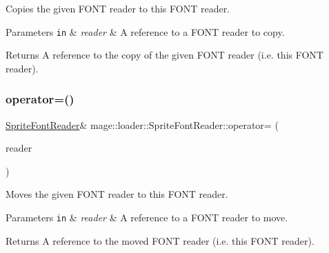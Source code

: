 Copies the given F\+O\+NT reader to this F\+O\+NT reader.


\begin{DoxyParams}[1]{Parameters}
\mbox{\tt in}  & {\em reader} & A reference to a F\+O\+NT reader to copy. \\
\hline
\end{DoxyParams}
\begin{DoxyReturn}{Returns}
A reference to the copy of the given F\+O\+NT reader (i.\+e. this F\+O\+NT reader). 
\end{DoxyReturn}
\hypertarget{classmage_1_1loader_1_1_sprite_font_reader_a99c1034c7dbe89b5e2dc2f2106c09360}{}\label{classmage_1_1loader_1_1_sprite_font_reader_a99c1034c7dbe89b5e2dc2f2106c09360} 
\subsubsection{\texorpdfstring{operator=()}{operator=()}\hspace{0.1cm}{\footnotesize\ttfamily [2/2]}}
{\footnotesize\ttfamily \hyperlink{classmage_1_1loader_1_1_sprite_font_reader}{Sprite\+Font\+Reader}\& mage\+::loader\+::\+Sprite\+Font\+Reader\+::operator= (\begin{DoxyParamCaption}\item[{\hyperlink{classmage_1_1loader_1_1_sprite_font_reader}{Sprite\+Font\+Reader} \&\&}]{reader }\end{DoxyParamCaption})\hspace{0.3cm}{\ttfamily [delete]}}

Moves the given F\+O\+NT reader to this F\+O\+NT reader.


\begin{DoxyParams}[1]{Parameters}
\mbox{\tt in}  & {\em reader} & A reference to a F\+O\+NT reader to move. \\
\hline
\end{DoxyParams}
\begin{DoxyReturn}{Returns}
A reference to the moved F\+O\+NT reader (i.\+e. this F\+O\+NT reader). 
\end{DoxyReturn}
\hypertarget{classmage_1_1loader_1_1_sprite_font_reader_a9726c5e3ee8692a2e2f4a2c9b4b7adba}{}\label{classmage_1_1loader_1_1_sprite_font_reader_a9726c5e3ee8692a2e2f4a2c9b4b7adba} 
